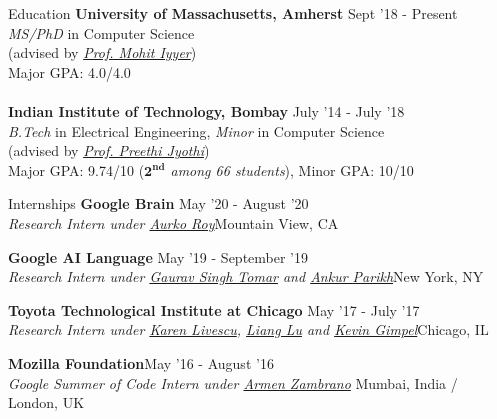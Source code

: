 \documentclass{resume} %
\begin{document}
\begin{rSection}{Education}
\vspace*{0.1in}
{\bf University of Massachusetts, Amherst} \hfill {Sept '18 - Present} \\ \textit{MS/PhD} in Computer Science \\ (advised by \textit{\href{https://people.cs.umass.edu/~miyyer/}{Prof. Mohit Iyyer}}) \\
Major GPA: 4.0/4.0\\\\
{\bf Indian Institute of Technology, Bombay} \hfill {July '14 - July '18} \\ 
\textit{B.Tech} in Electrical Engineering, \textit{Minor} in Computer Science\\
(advised by \textit{\href{https://www.cse.iitb.ac.in/~pjyothi/}{Prof. Preethi Jyothi}})\\
Major GPA: 9.74/10 (\textit{$\mathbf{2^{nd}}$ among 66 students}), Minor GPA: 10/10
\end{rSection}

\begin{rSection}{Internships}
\vspace*{0.1in}
{\bf Google Brain} { \hfill May '20 - August '20}\\ \textit{Research Intern under \href{https://sites.google.com/site/royaurko/}{Aurko Roy}}{\hfill Mountain View, CA}

{\bf Google AI Language}{ \hfill May '19 - September '19}\\ \textit{Research Intern under \href{https://ai.google/research/people/GauravSinghTomar/}{Gaurav Singh Tomar} and \href{www.ankurparikh.com}{Ankur Parikh}}{\hfill New York, NY}

{\bf Toyota Technological Institute at Chicago}{ \hfill May '17 - July '17}\\ \textit{Research Intern under \href{http://ttic.uchicago.edu/~klivescu/}{Karen Livescu}, \href{http://ttic.uchicago.edu/~llu/}{Liang Lu} and \href{http://ttic.uchicago.edu/~kgimpel/}{Kevin Gimpel}}{\hfill Chicago, IL}

{\bf Mozilla Foundation}{\hfill May '16 - August '16} \\ \textit{Google Summer of Code Intern under \href{https://github.com/armenzg}{Armen Zambrano}}{ \hfill Mumbai, India / London, UK}
\end{rSection}
\end{document}
